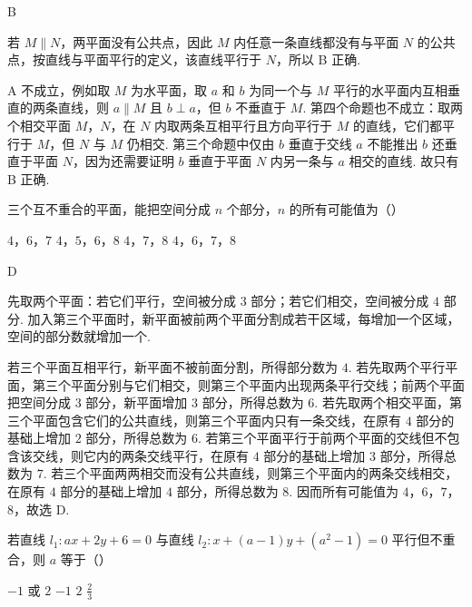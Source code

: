 \documentclass[UTF8,a4paper,oneside,11pt]{ctexbook}
\begin{document}
\begin{answer}
B
\end{answer}

\begin{solution}
若 \(M\parallel N\)，两平面没有公共点，因此 \(M\) 内任意一条直线都没有与平面 \(N\) 的公共点，按直线与平面平行的定义，该直线平行于 \(N\)，所以 B 正确.

A 不成立，例如取 \(M\) 为水平面，取 \(a\) 和 \(b\) 为同一个与 \(M\) 平行的水平面内互相垂直的两条直线，则 \(a\parallel M\) 且 \(b\perp a\)，但 \(b\) 不垂直于 \(M\). 第四个命题也不成立：取两个相交平面 \(M\)，\(N\)，在 \(N\) 内取两条互相平行且方向平行于 \(M\) 的直线，它们都平行于 \(M\)，但 \(N\) 与 \(M\) 仍相交. 第三个命题中仅由 \(b\) 垂直于交线 \(a\) 不能推出 \(b\) 还垂直于平面 \(N\)，因为还需要证明 \(b\) 垂直于平面 \(N\) 内另一条与 \(a\) 相交的直线. 故只有 B 正确.
\end{solution}

\begin{problem}
三个互不重合的平面，能把空间分成 \(n\) 个部分，\(n\) 的所有可能值为（\quad）

\choices
    {\(4\)，\(6\)，\(7\)}
    {\(4\)，\(5\)，\(6\)，\(8\)}
    {\(4\)，\(7\)，\(8\)}
    {\(4\)，\(6\)，\(7\)，\(8\)}
\end{problem}

\begin{answer}
D
\end{answer}

\begin{solution}
先取两个平面：若它们平行，空间被分成 \(3\) 部分；若它们相交，空间被分成 \(4\) 部分. 加入第三个平面时，新平面被前两个平面分割成若干区域，每增加一个区域，空间的部分数就增加一个.

若三个平面互相平行，新平面不被前面分割，所得部分数为 \(4\). 若先取两个平行平面，第三个平面分别与它们相交，则第三个平面内出现两条平行交线；前两个平面把空间分成 \(3\) 部分，新平面增加 \(3\) 部分，所得总数为 \(6\). 若先取两个相交平面，第三个平面包含它们的公共直线，则第三个平面内只有一条交线，在原有 \(4\) 部分的基础上增加 \(2\) 部分，所得总数为 \(6\). 若第三个平面平行于前两个平面的交线但不包含该交线，则它内的两条交线平行，在原有 \(4\) 部分的基础上增加 \(3\) 部分，所得总数为 \(7\). 若三个平面两两相交而没有公共直线，则第三个平面内的两条交线相交，在原有 \(4\) 部分的基础上增加 \(4\) 部分，所得总数为 \(8\). 因而所有可能值为 \(4\)，\(6\)，\(7\)，\(8\)，故选 D.
\end{solution}

\begin{problem}
若直线 \(l_1\colon ax+2y+6=0\) 与直线 \(l_2\colon x+\left(a-1\right)y+\left(a^2-1\right)=0\) 平行但不重合，则 \(a\) 等于（\quad）

\choices
    {\(-1\) 或 \(2\)}
    {\(-1\)}
    {\(2\)}
    {\(\frac{2}{3}\)}
\end{problem}
\end{document}
